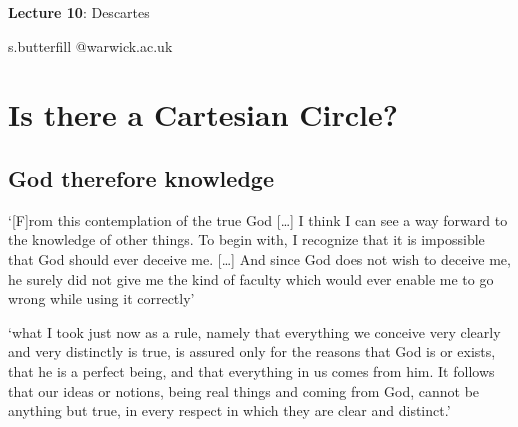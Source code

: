 \documentclass[12pt]{extarticle}
\date{}
\makeatletter
\def \ititle {Descartes}
\def \isubtitle {Lecture 02}
\def \iemail{s.butterfill @warwick.ac.uk}
\makeatother
\begin{document}
\begin{multicols*}{3}

\setlength\footnotesep{1em}











      
\def \ititle {Lecture 10}
 
\def \isubtitle {Descartes}
 
\begin{center}
 
{\Large
 
\textbf{\ititle}: \isubtitle
 
}
 
 
 
\iemail %
 
\end{center}
 
 
 
\section{Is there a Cartesian Circle?}

\subsection{God therefore knowledge}
‘[F]rom this contemplation of the true God [\dots] I think I can see a way forward to the knowledge
of other things. To begin with, I recognize that it is impossible that God
should ever deceive me. [\dots] And since God does not wish to deceive me, he
surely did not give me the kind of faculty which would ever enable me to go
wrong while using it correctly’
\citep[p.~37, AT VII:53–54]{descartes:1985_csm2}
 
‘what I took just now as a rule, namely that everything we
conceive very clearly and very distinctly is true, is assured only for the
reasons that God is or exists, that he is a perfect being, and that
everything in us comes from him. It follows that our ideas or notions,
being real things and coming from God, cannot be anything but true, in
every respect in which they are clear and distinct.’
\citep[p.~130, AT VI:38]{descartes:1985_csm1}
 

\end{multicols*}
\end{document}
